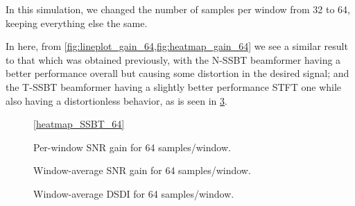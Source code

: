 In this simulation, we changed the number of samples per window from 32 to 64, keeping everything else the same.

In here, from \cref{fig:lineplot_gain_64,fig:heatmap_gain_64} we see a similar result to that which was obtained previously, with the N-SSBT beamformer having a better performance overall but causing some distortion in the desired signal; and the T-SSBT beamformer having a slightly better performance STFT one while also having a distortionless behavior, as is seen in \cref{fig:lineplot_dsdi_64}.



\begin{figure}[H]
	\centering
	
	
	\vspace*{0.4em}
	\ref*{heatmap_SSBT_64}
	\caption{Per-window SNR gain for 64 samples/window.}
	\label{fig:heatmap_gain_64}
\end{figure}

\begin{figure}[H]
\centering

\caption{Window-average SNR gain for 64 samples/window.}
\label{fig:lineplot_gain_64}
\end{figure}

\begin{figure}[H]
	\centering
	
	\caption{Window-average DSDI for 64 samples/window.}
	\label{fig:lineplot_dsdi_64}
\end{figure}